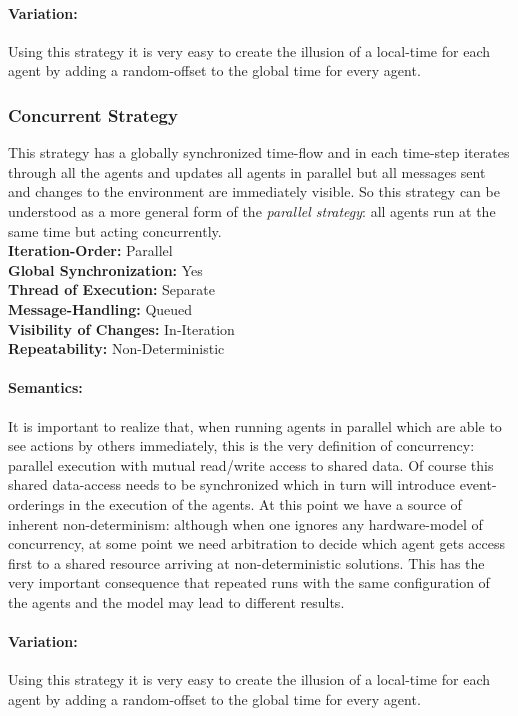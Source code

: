 \paragraph{Variation:} Using this strategy it is very easy to create the illusion of a local-time for each agent by adding a random-offset to the global time for every agent.

\subsubsection{Concurrent Strategy}
This strategy has a globally synchronized time-flow and in each time-step iterates through all the agents and updates all agents in parallel but all messages sent and changes to the environment are immediately visible. So this strategy can be understood as a more general form of the \textit{parallel strategy}: all agents run at the same time but acting concurrently. \\

\textbf{Iteration-Order:} Parallel \\
\textbf{Global Synchronization:} Yes \\
\textbf{Thread of Execution:} Separate \\
\textbf{Message-Handling:} Queued \\
\textbf{Visibility of Changes:}	In-Iteration \\
\textbf{Repeatability:}	Non-Deterministic 

\paragraph{Semantics:} It is important to realize that, when running agents in parallel which are able to see actions by others immediately, this is the very definition of concurrency: parallel execution with mutual read/write access to shared data. Of course this shared data-access needs to be synchronized which in turn will introduce event-orderings in the execution of the agents. At this point we have a source of inherent non-determinism: although when one ignores any hardware-model of concurrency, at some point we need arbitration to decide which agent gets access first to a shared resource arriving at non-deterministic solutions. This has the very important consequence that repeated runs with the same configuration of the agents and the model may lead to different results.

\paragraph{Variation:} Using this strategy it is very easy to create the illusion of a local-time for each agent by adding a random-offset to the global time for every agent.



